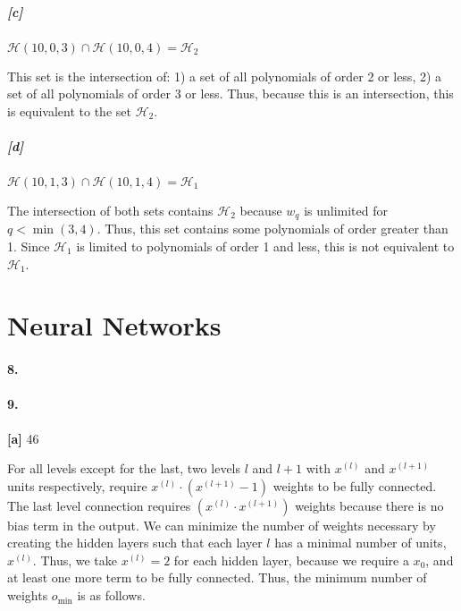 \documentclass[10pt,letter]{article}
\begin{document}
\subparagraph{[c]} $\mathcal H(10,0,3) \cap \mathcal H(10,0,4) = \mathcal H_2$

	This set is the intersection of: 1) a set of all polynomials of order 2 or less, 2) a set of all polynomials of order 3 or less. Thus, because this is an intersection, this is equivalent to the set $\mathcal H_2$.

\subparagraph{[d]} $\mathcal H(10,1,3) \cap \mathcal H(10,1,4) = \mathcal H_1$

	The intersection of both sets contains $\mathcal H_2$ because $w_q$ is unlimited for $q < \min(3,4)$. Thus, this set contains some polynomials of order greater than 1. Since $\mathcal H_1$ is limited to polynomials of order 1 and less, this is not equivalent to $\mathcal H_1$.

\section*{Neural Networks}

\paragraph{8.}



\paragraph{9.} \textbf{[a]} 46
	
	For all levels except for the last, two levels $l$ and $l+1$ with $x^{(l)}$ and $x^{(l+1)}$ units respectively, require $x^{(l)}\cdot(x^{(l+1)}-1)$ weights to be fully connected. The last level connection requires $(x^{(l)}\cdot x^{(l+1)})$ weights because there is no bias term in the output. We can minimize the number of weights necessary by creating the hidden layers such that each layer $l$ has a minimal number of units, $x^{(l)}$. Thus, we take $x^{(l)} = 2$ for each hidden layer, because we require a $x_0$, and at least one more term to be fully connected. Thus, the minimum number of weights $o_{\text{min}}$ is as follows.
\end{document}
